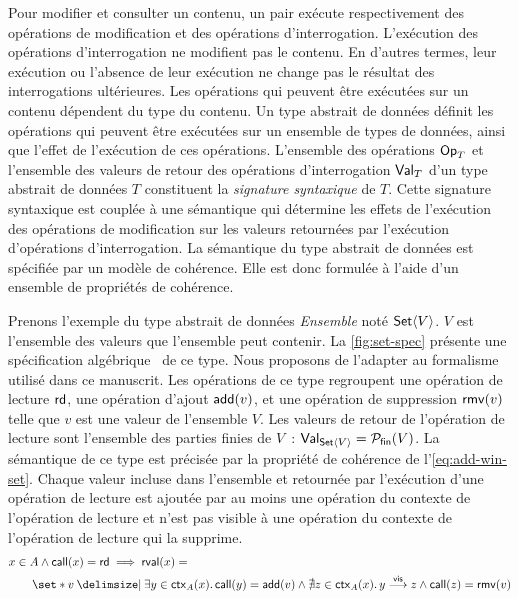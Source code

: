 Pour modifier et consulter un contenu, un pair exécute respectivement des opérations de modification et des opérations d'interrogation.
L'exécution des opérations d'interrogation ne modifient pas le contenu.
En d'autres termes, leur exécution ou l'absence de leur exécution ne change pas le résultat des interrogations ultérieures.
Les opérations qui peuvent être exécutées sur un contenu dépendent du type du contenu.
Un type abstrait de données définit les opérations qui peuvent être exécutées sur un ensemble de types de données, ainsi que l'effet de l'exécution de ces opérations.
L'ensemble des opérations $\trm{Op}_T$ et l'ensemble des valeurs de retour des opérations d'interrogation $\trm{Val}_T$ d'un type abstrait de données $T$ constituent la \emph{signature syntaxique} de $T$.
Cette signature syntaxique est couplée à une sémantique qui détermine les effets de l'exécution des opérations de modification sur les valeurs retournées par l'exécution d'opérations d'interrogation.
La sémantique du type abstrait de données est spécifiée par un modèle de cohérence.
Elle est donc formulée à l'aide d'un ensemble de propriétés de cohérence.

Prenons l'exemple du type abstrait de données \emph{Ensemble} noté $\trm{Set}\tuple*{V}$.
$V$ est l'ensemble des valeurs que l'ensemble peut contenir.
La \autoref{fig:set-spec} présente une spécification algébrique~\autocite{wirsing1990_algebraicspec} de ce type.
Nous proposons de l'adapter au formalisme utilisé dans ce manuscrit.
Les opérations de ce type regroupent une opération de lecture $\trm{rd}$, une opération d'ajout $\trm{add}(v)$, et une opération de suppression $\trm{rmv}(v)$ telle que $v$ est une valeur de l'ensemble $V$.
Les valeurs de retour de l'opération de lecture sont l'ensemble des parties finies de $V$~: $\trm{Val}_{\trm{Set}\tuple*{V}} = \powerfset{V}$.
La sémantique de ce type est précisée par la propriété de cohérence de l'\autoref{eq:add-win-set}.
Chaque valeur incluse dans l'ensemble et retournée par l'exécution d'une opération de lecture est ajoutée par au moins une opération du contexte de l'opération de lecture et n'est pas visible à une opération du contexte de l'opération de lecture qui la supprime.
%
\begin{equation}\begin{split}\label{eq:add-win-set}
\MoveEqLeft x \in A \land \trm{call}(x) = \trm{rd} \implies \trm{rval}(x) =\\
    &\set*{v \given \exists y \in \trm{ctx}_A(x) \qsep \trm{call}(y) = \trm{add}(v) \land \nexists z \in \trm{ctx}_A(x) \qsep y \vis z \land \trm{call}(z) = \trm{rmv}(v)}
\end{split}\end{equation}

